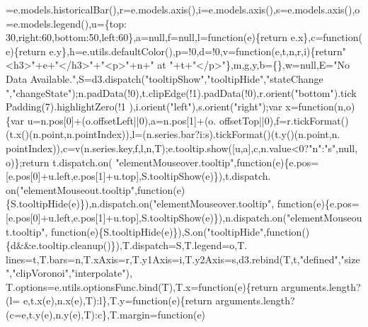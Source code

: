 \begin{DoxyCode}
{      =e.models.historicalBar(),r=e.models.axis(),i=e.models.axis(),s=e.models.axis(),o=e.models.legend(),u=\{top:
      30,right:60,bottom:50,left:60\},a=null,f=null,l=\textcolor{keyword}{function}(e)\{\textcolor{keywordflow}{return} e.x\},c=\textcolor{keyword}{function}(
      e)\{\textcolor{keywordflow}{return} e.y\},h=e.utils.defaultColor(),p=!0,d=!0,v=\textcolor{keyword}{function}(e,t,n,r,i)\{\textcolor{keywordflow}{return}\textcolor{stringliteral}{"<h3>"}+e+\textcolor{stringliteral}{"</h3>"}+\textcolor{stringliteral}{"<p>"}+n+\textcolor{stringliteral}{" at
       "}+t+\textcolor{stringliteral}{"</p>"}\},m,g,y,b=\{\},w=null,E=\textcolor{stringliteral}{"No Data Available."},S=d3.dispatch(\textcolor{stringliteral}{"tooltipShow"},\textcolor{stringliteral}{"tooltipHide"},\textcolor{stringliteral}{"stateChange
      "},\textcolor{stringliteral}{"changeState"});n.padData(!0),t.clipEdge(!1).padData(!0),r.orient(\textcolor{stringliteral}{"bottom"}).tickPadding(7).highlightZero(!1
      ),i.orient(\textcolor{stringliteral}{"left"}),s.orient(\textcolor{stringliteral}{"right"});var x=\textcolor{keyword}{function}(n,o)\{var u=n.pos[0]+(o.offsetLeft||0),a=n.pos[1]+(o.
      offsetTop||0),f=r.tickFormat()(t.x()(n.point,n.pointIndex)),l=(n.series.bar?i:s).tickFormat()(t.y()(n.point,n.
      pointIndex)),c=v(n.series.key,f,l,n,T);e.tooltip.show([u,a],c,n.value<0?\textcolor{stringliteral}{"n"}:\textcolor{stringliteral}{"s"},null,o)\};\textcolor{keywordflow}{return} t.dispatch.on(\textcolor{stringliteral}{
      "elementMouseover.tooltip"},\textcolor{keyword}{function}(e)\{e.pos=[e.pos[0]+u.left,e.pos[1]+u.top],S.tooltipShow(e)\}),t.dispatch.
      on(\textcolor{stringliteral}{"elementMouseout.tooltip"},\textcolor{keyword}{function}(e)\{S.tooltipHide(e)\}),n.dispatch.on(\textcolor{stringliteral}{"elementMouseover.tooltip"},\textcolor{keyword}{
      function}(e)\{e.pos=[e.pos[0]+u.left,e.pos[1]+u.top],S.tooltipShow(e)\}),n.dispatch.on(\textcolor{stringliteral}{"elementMouseout.tooltip"},\textcolor{keyword}{
      function}(e)\{S.tooltipHide(e)\}),S.on(\textcolor{stringliteral}{"tooltipHide"},\textcolor{keyword}{function}()\{d&&e.tooltip.cleanup()\}),T.dispatch=S,T.legend=o,T.
      lines=t,T.bars=n,T.xAxis=r,T.y1Axis=i,T.y2Axis=s,d3.rebind(T,t,\textcolor{stringliteral}{"defined"},\textcolor{stringliteral}{"size"},\textcolor{stringliteral}{"clipVoronoi"},\textcolor{stringliteral}{"interpolate"}),
      T.options=e.utils.optionsFunc.bind(T),T.x=\textcolor{keyword}{function}(e)\{\textcolor{keywordflow}{return} arguments.length?(l=
      e,t.x(e),n.x(e),T):l\},T.y=\textcolor{keyword}{function}(e)\{\textcolor{keywordflow}{return} arguments.length?(c=e,t.y(e),n.y(e),T):c\},T.margin=\textcolor{keyword}{function}(e)
}
\end{DoxyCode}
